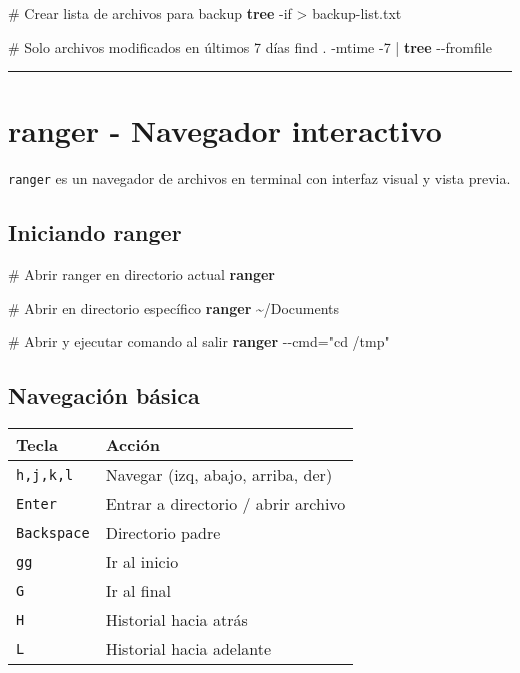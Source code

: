 \documentclass[
  11pt,
  letterpaper,
  oneside,
  openany]{scrbook}
\newenvironment{Shaded}{}{}
\newcommand{\AttributeTok}[1]{\textcolor[rgb]{0.84,0.23,0.29}{#1}}
\newcommand{\CommentTok}[1]{\textcolor[rgb]{0.42,0.45,0.49}{#1}}
\newcommand{\ExtensionTok}[1]{\textcolor[rgb]{0.84,0.23,0.29}{\textbf{#1}}}
\newcommand{\FunctionTok}[1]{\textcolor[rgb]{0.44,0.26,0.76}{#1}}
\newcommand{\KeywordTok}[1]{\textcolor[rgb]{0.84,0.23,0.29}{#1}}
\newcommand{\NormalTok}[1]{\textcolor[rgb]{0.14,0.16,0.18}{#1}}
\newcommand{\OperatorTok}[1]{\textcolor[rgb]{0.14,0.16,0.18}{#1}}
\newcommand{\StringTok}[1]{\textcolor[rgb]{0.01,0.18,0.38}{#1}}
\begin{document}
\begin{Shaded}
\begin{Highlighting}[]
\CommentTok{\# Crear lista de archivos para backup}
\ExtensionTok{tree} \AttributeTok{{-}if} \OperatorTok{\textgreater{}}\NormalTok{ backup{-}list.txt}

\CommentTok{\# Solo archivos modificados en últimos 7 días}
\FunctionTok{find}\NormalTok{ . }\AttributeTok{{-}mtime} \AttributeTok{{-}7} \KeywordTok{|} \ExtensionTok{tree} \AttributeTok{{-}{-}fromfile}
\end{Highlighting}
\end{Shaded}

\begin{center}\rule{0.5\linewidth}{0.5pt}\end{center}

\section{ranger - Navegador interactivo}\label{sec-ranger}

\texttt{ranger} es un navegador de archivos en terminal con interfaz
visual y vista previa.

\subsection{Iniciando ranger}\label{iniciando-ranger}

\begin{Shaded}
\begin{Highlighting}[]
\CommentTok{\# Abrir ranger en directorio actual}
\ExtensionTok{ranger}

\CommentTok{\# Abrir en directorio específico}
\ExtensionTok{ranger}\NormalTok{ \textasciitilde{}/Documents}

\CommentTok{\# Abrir y ejecutar comando al salir}
\ExtensionTok{ranger} \AttributeTok{{-}{-}cmd}\OperatorTok{=}\StringTok{"cd /tmp"}
\end{Highlighting}
\end{Shaded}

\subsection{Navegación básica}\label{navegaciuxf3n-buxe1sica}

\begin{longtable}[]{@{}ll@{}}
\toprule\noalign{}
Tecla & Acción \\
\midrule\noalign{}
\endhead
\bottomrule\noalign{}
\endlastfoot
\texttt{h,j,k,l} & Navegar (izq, abajo, arriba, der) \\
\texttt{Enter} & Entrar a directorio / abrir archivo \\
\texttt{Backspace} & Directorio padre \\
\texttt{gg} & Ir al inicio \\
\texttt{G} & Ir al final \\
\texttt{H} & Historial hacia atrás \\
\texttt{L} & Historial hacia adelante \\
\end{longtable}
\end{document}
